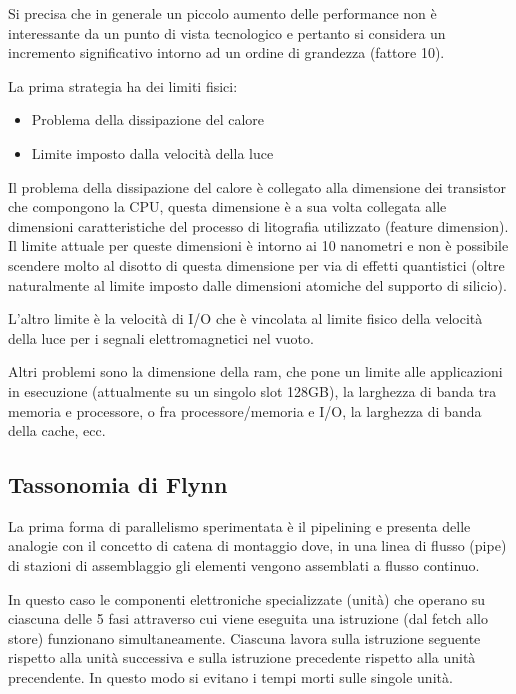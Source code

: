 Si precisa che in generale un piccolo aumento delle performance non è
interessante da un punto di vista tecnologico e pertanto si considera un
incremento significativo intorno ad un ordine di grandezza (fattore 10).

La prima strategia ha dei limiti fisici:

\begin{itemize}
\tightlist
\item
  Problema della dissipazione del calore
\item
  Limite imposto dalla velocità della luce
\end{itemize}

Il problema della dissipazione del calore è collegato alla dimensione
dei transistor che compongono la CPU, questa dimensione è a sua volta
collegata alle dimensioni caratteristiche del processo di litografia
utilizzato (feature dimension). Il limite attuale per queste dimensioni
è intorno ai 10 nanometri e non è possibile scendere molto al disotto di
questa dimensione per via di effetti quantistici (oltre naturalmente al
limite imposto dalle dimensioni atomiche del supporto di silicio).

L'altro limite è la velocità di I/O che è vincolata al limite fisico
della velocità della luce per i segnali elettromagnetici nel vuoto.

Altri problemi sono la dimensione della ram, che pone un limite alle
applicazioni in esecuzione (attualmente su un singolo slot 128GB), la
larghezza di banda tra memoria e processore, o fra processore/memoria e
I/O, la larghezza di banda della cache, ecc.

\subsection{Tassonomia di Flynn}\label{tassonomia-di-flynn}

La prima forma di parallelismo sperimentata è il pipelining e presenta
delle analogie con il concetto di catena di montaggio dove, in una linea
di flusso (pipe) di stazioni di assemblaggio gli elementi vengono
assemblati a flusso continuo.

In questo caso le componenti elettroniche specializzate (unità) che
operano su ciascuna delle 5 fasi attraverso cui viene eseguita una
istruzione (dal fetch allo store) funzionano simultaneamente. Ciascuna
lavora sulla istruzione seguente rispetto alla unità successiva e sulla
istruzione precedente rispetto alla unità precendente. In questo modo si
evitano i tempi morti sulle singole unità.

